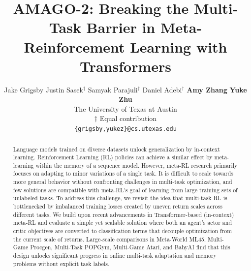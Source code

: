 \documentclass{article}
\title{AMAGO-2: Breaking the Multi-Task Barrier in Meta-Reinforcement Learning with Transformers}
\author{
Jake Grigsby \hspace{-2mm} \quad Justin Sasek$^{\dagger}$ \quad \hspace{-2mm}Samyak Parajuli$^{\dagger}$ \quad
 \hspace{-2mm} Daniel Adebi$^{\dagger}$ \quad \hspace{-2mm} \textbf{Amy Zhang} \quad \hspace{-2mm}
 \textbf{Yuke Zhu} \\
The University of Texas at Austin \\
$\dagger$ Equal contribution \\
\texttt{\{grigsby,yukez\}@cs.utexas.edu}\\
}
\begin{document}
\maketitle
\begin{abstract}
Language models trained on diverse datasets unlock generalization by in-context learning. Reinforcement Learning (RL) policies can achieve a similar effect by meta-learning within the memory of a sequence model. However, meta-RL research primarily focuses on adapting to minor variations of a single task. It is difficult to scale towards more general behavior without confronting challenges in multi-task optimization, and few solutions are compatible with meta-RL's goal of learning from large training sets of unlabeled tasks. To address this challenge, we revisit the idea that multi-task RL is bottlenecked by imbalanced training losses created by uneven return scales across different tasks. We build upon recent advancements in Transformer-based (in-context) meta-RL and evaluate a simple yet scalable solution where both an agent's actor and critic objectives are converted to classification terms that decouple optimization from the current scale of returns. Large-scale comparisons in Meta-World ML45, Multi-Game Procgen, Multi-Task POPGym, Multi-Game Atari, and BabyAI find that this design unlocks significant progress in online multi-task adaptation and memory problems without explicit task labels.
\end{abstract}
\end{document}
